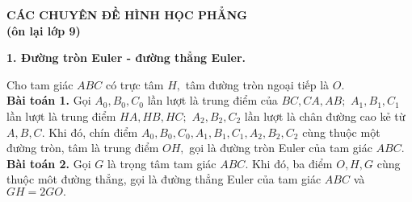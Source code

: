 \documentclass[12pt,a4paper]{article}
\begin{document}
\sloppy
\fussy
\begin{center}
\fontsize{20}{16}\selectfont
\textbf{CÁC CHUYÊN ĐỀ HÌNH HỌC PHẲNG}\\
\textbf{(ôn lại lớp 9)}
\end{center}
\begin{center}
\fontsize{16}{16}\selectfont
\textbf{1. Đường tròn Euler - đường thẳng Euler.}
\end{center}
\fontsize{14}{12}\selectfont
Cho tam giác \(ABC\) có trực tâm \(H,\) tâm đường tròn ngoại tiếp là \(O.\)\\
\textbf{Bài toán 1.} Gọi \({A_0},{B_0},{C_0}\) lần lượt là trung điểm của \(BC,CA,AB;\) \({A_1},{B_1},{C_1}\) lần lượt là trung điểm \(HA,HB,HC;\) \({A_2},{B_2},{C_2}\) lần lượt là chân đường cao kẻ từ \(A,B,C.\) Khi đó, chín điểm \({A_0},{B_0},{C_0},{A_1},{B_1},{C_1},{A_2},{B_2},{C_2}\) cùng thuộc một đường tròn, tâm là trung điểm \(OH,\) gọi là đường tròn Euler của tam giác \(ABC.\)\\
\textbf{Bài toán 2.} Gọi \(G\) là trọng tâm tam giác \(ABC.\) Khi đó, ba điểm \(O,H,G\) cùng thuộc môt đường thẳng, gọi là đường thẳng Euler của tam giác \(ABC\) và \(GH = 2GO.\)
\end{document}
